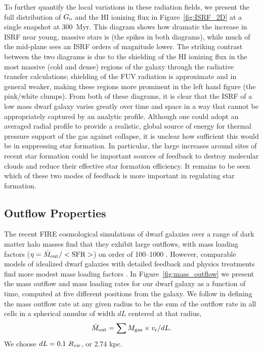 \documentclass[fleqn,usenatbib,useAMS]{mnras}
\begin{document}
To further quantify the local variations in these radiation fields, we present the full distribution of $G_{\rm o}$ and the HI ionizing flux in Figure~\ref{fig:ISRF_2D} at a single snapshot at 300~Myr. This diagram shows how dramatic the increase in ISRF near young, massive stars is (the spikes in both diagrams), while much of the mid-plane sees an ISRF orders of magnitude lower. The striking contrast between the two diagrams is due to the shielding of the HI ionizing flux in the most massive (cold and dense) regions of the galaxy through the radiative transfer calculations; shielding of the FUV radiation is approximate and in general weaker, making these regions more prominent in the left hand figure (the pink/white clumps). From both of these diagrams, it is clear that the ISRF of a low mass dwarf galaxy varies greatly over time and space in a way that cannot be appropriately captured by an analytic profile. Although one could adopt an averaged radial profile to provide a realistic, global source of energy for thermal pressure support of the gas against collapse, it is unclear how sufficient this would be in suppressing star formation. In particular, the large increases around sites of recent star formation could be important sources of feedback to destroy molecular clouds and reduce their effective star formation efficiency. It remains to be seen which of these two modes of feedback is more important in regulating star formation.

\subsection{Outflow Properties}
\label{sec:outflows}

The recent FIRE cosmological simulations of dwarf galaxies over a range of dark matter halo masses find that they exhibit large outflows, with mass loading factors ($\eta = \dot{M}_{\rm out}/<\rm{SFR}>$) on order of 100--1000 \citep{Muratov2015}. However, comparable models of idealized dwarf galaxies with detailed feedback and physics treatments find more modest mass loading factors \citep{Hu2016,Hu2017}. In Figure~\ref{fig:mass_outflow} we present the mass outflow and mass loading rates for our dwarf galaxy as a function of time, computed at five different positions from the galaxy. We follow \citet{Muratov2015} in defining the mass outflow rate at any given radius to be the sum of the outflow rate in all cells in a spherical annulus of width $dL$ centered at that radius,
\begin{equation} \label{eq:dotM}
\dot{M}_{\rm out} = \sum M_{\rm gas} \times v_{\rm r} / dL.
\end{equation} 
We choose $dL = 0.1~R_{\rm vir}$, or 2.74 kpc. 
\end{document}
